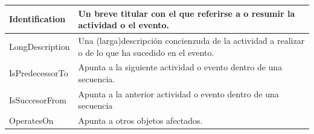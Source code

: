 \documentclass[spanish,12pt,a4paper,final,oneside]{book}
\begin{document}
\begin{longtable}{|p{2.5cm} p{11cm}|}
\hline

Identification & Un breve titular con el que referirse a o resumir la actividad o el evento.
\\[0.1cm] \hline

LongDescription & Una (larga)descripción concienzuda de la actividad a realizar o de lo que ha sucedido en el evento.
\\[0.1cm] \hline

IsPredecessorTo & Apunta a la siguiente actividad o evento dentro de una secuencia.
\\[0.1cm] \hline

IsSuccesorFrom & Apunta a la anterior actividad o evento dentro de una secuencia
\\[0.1cm] \hline

OperatesOn & Apunta a otros objetos afectados.
\\[0.1cm] \hline

\end{longtable}
\end{document}
